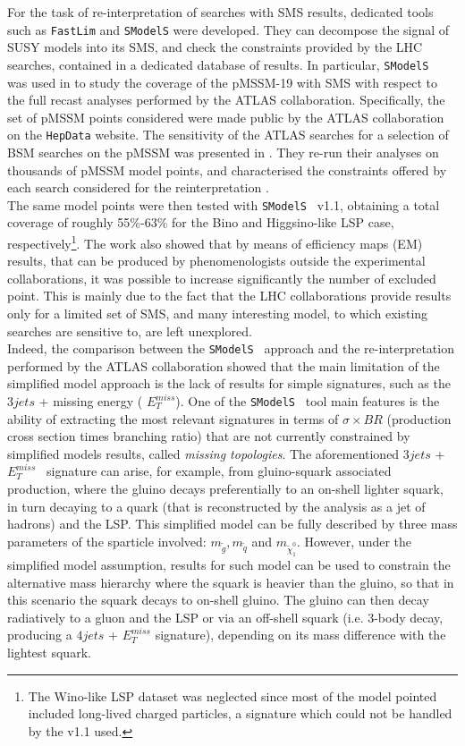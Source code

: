 \documentclass[a4paper,11pt]{article}
\newcommand{\MET}{{ $E_T ^{miss}$}}
\newcommand{\SMO}{\texttt{SModelS\xspace}}
\newcommand{\FASTLIM}{\texttt{FastLim}}
\begin{document}
For the task of re-interpretation of searches with SMS results, 
dedicated tools such as \FASTLIM \cite{Papucci:2014rja} and \SMO \cite{Kraml:2014sna} were developed. They can decompose the signal of SUSY models into its SMS, and check the constraints provided by the LHC searches, contained in a dedicated database of results. In particular, \SMO~ was used in \cite{Ambrogi:2017lov} to study the coverage of the pMSSM-19\cite{Djouadi:1998di} with SMS with respect to the full recast analyses performed by the ATLAS collaboration. Specifically, the set of pMSSM points considered were made public by the ATLAS collaboration on the \texttt{HepData} website\cite{ATLASpMSSMhepdata}. The sensitivity of the ATLAS searches for a selection of BSM searches on the pMSSM was presented in \cite{Aad:2015baa}. They re-run their analyses on thousands of pMSSM model points, and characterised the constraints offered by each search considered for the reinterpretation .
%
\\
The same model points were then tested with \SMO~ v1.1\cite{Ambrogi:2017neo}, obtaining a total coverage of roughly 55$\%$-63$\%$ for the Bino and Higgsino-like LSP case, respectively\footnote{The Wino-like LSP dataset was neglected since most of the model pointed included long-lived charged particles, a signature which could not be handled by the v1.1 used.}. The work also showed that by means of efficiency maps (EM) results, that can be produced by phenomenologists outside the experimental collaborations, it was possible to increase significantly the number of excluded point. This is mainly due to the fact that the LHC collaborations provide results only for a limited set of SMS, and many interesting model, to which existing searches are sensitive to, are left unexplored.
\\
Indeed, the comparison between the \SMO~ approach and the re-interpretation performed by the ATLAS collaboration showed  that the main limitation of the simplified model approach is the lack of results for simple signatures, such as the $3jets$ + missing energy (\MET). One of the \SMO~ tool main features is the ability of extracting the most relevant signatures in terms of $\sigma \times BR$ (production cross section  times branching ratio) that are not currently constrained by simplified models results, called \textit{missing topologies}. The aforementioned $3jets$ +\MET~ signature can arise, for example, from gluino-squark associated production, where the gluino decays preferentially to an on-shell lighter squark, in turn decaying to a quark (that is reconstructed by the analysis as a jet of hadrons) and the LSP. This simplified model can be fully described by three mass parameters of the sparticle involved: $m_{\tilde g}, m_{\tilde q}$ and $m_{\tilde \chi _1 ^0}$. However, under the simplified model assumption, results for such model can be used to constrain the alternative mass hierarchy where the squark is heavier than the gluino, so that in this scenario the squark decays to on-shell gluino. The gluino can then decay radiatively to a gluon and the LSP or via an off-shell squark (i.e. 3-body decay, producing a $4jets$ + $E_T ^{miss}$ signature), depending on its mass difference with the lightest squark. 
\end{document}

